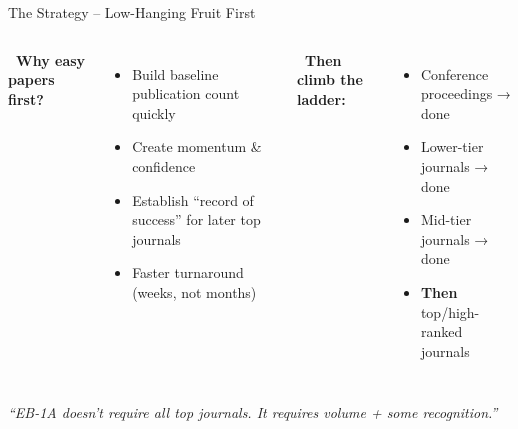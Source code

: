 \documentclass[aspectratio=169, 10pt]{beamer}
\begin{document}
	\begin{frame}{The Strategy – Low-Hanging Fruit First}
		\begin{columns}[T]
			\textbf{\faChartLine \ Why easy papers first?}
			\begin{itemize}
				\item Build baseline publication count quickly
				\item Create momentum \& confidence
				\item Establish “record of success” for later top journals
				\item Faster turnaround (weeks, not months)
			\end{itemize}
			
			\textbf{\faArrowUp \ Then climb the ladder:}
			\begin{itemize}
				\item Conference proceedings → done
				\item Lower-tier journals → done
				\item Mid-tier journals → done
				\item \textbf{Then} top/high-ranked journals
			\end{itemize}
		\end{columns}
		
		\vspace{0.3cm}
		\centering
		\textcolor{accentgold}{\textit{“EB-1A doesn't require all top journals. It requires volume + some recognition.”}}
	\end{frame}
	
\end{document}
